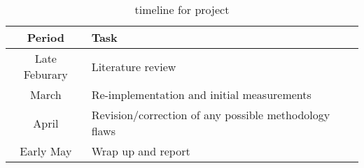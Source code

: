 \begin{table}
  \centering
  \begin{tabular}{ c|p{4cm} }
    \hline
    Period & Task \\
    \hline
    Late Feburary & Literature review \\
    March & Re-implementation and initial measurements \\
    April & Revision/correction of any possible methodology flaws \\
    Early May & Wrap up and report \\ 
    \hline
  \end{tabular}
  \label{tab:plan}
  \caption{timeline for project}
\end{table}

